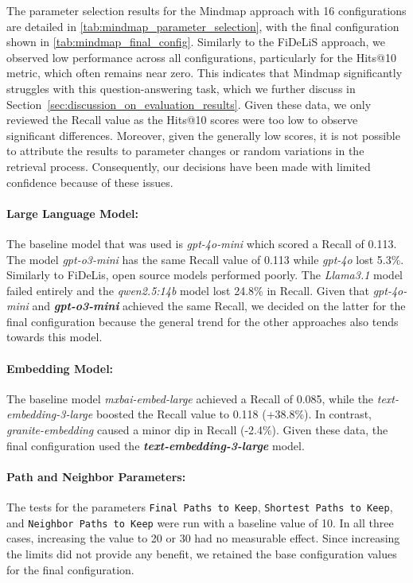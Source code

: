 The parameter selection results for the Mindmap approach with 16 configurations are detailed in \autoref{tab:mindmap_parameter_selection}, with the final configuration shown in \autoref{tab:mindmap_final_config}. Similarly to the FiDeLiS approach, we observed low performance across all configurations, particularly for the Hits@10 metric, which often remains near zero. This indicates that Mindmap significantly struggles with this question-answering task, which we further discuss in Section~\ref{sec:discussion_on_evaluation_results}. Given these data, we only reviewed the Recall value as the Hits@10 scores were too low to observe significant differences. Moreover, given the generally low scores, it is not possible to attribute the results to parameter changes or random variations in the retrieval process. Consequently, our decisions have been made with limited confidence because of these issues.

\paragraph{Large Language Model:}
The baseline model that was used is \emph{gpt-4o-mini} which scored a Recall of 0.113. The model \emph{gpt-o3-mini} has the same Recall value of 0.113 while \emph{gpt-4o} lost 5.3\%. Similarly to FiDeLis, open source models performed poorly. The \emph{Llama3.1} model failed entirely and the \emph{qwen2.5:14b} model lost 24.8\% in Recall. Given that \emph{gpt-4o-mini} and \textbf{\emph{gpt-o3-mini}} achieved the same Recall, we decided on the latter for the final configuration because the general trend for the other approaches also tends towards this model.

\paragraph{Embedding Model:}
The baseline model \emph{mxbai-embed-large} achieved a Recall of 0.085, while the \emph{text-embedding-3-large} boosted the Recall value to 0.118 (+38.8\%). In contrast, \emph{granite-embedding} caused a minor dip in Recall (-2.4\%). Given these data, the final configuration used the \textbf{\emph{text-embedding-3-large}} model.

\paragraph{Path and Neighbor Parameters:}
The tests for the parameters \texttt{Final Paths to Keep}, \texttt{Shortest Paths to Keep}, and \texttt{Neighbor Paths to Keep} were run with a baseline value of 10. In all three cases, increasing the value to 20 or 30 had no measurable effect. Since increasing the limits did not provide any benefit, we retained the base configuration values for the final configuration.

